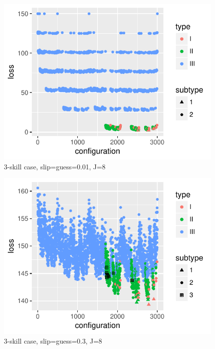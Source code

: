 \documentclass{edm_template}
\begin{document}
\begin{figure}[h!]
  \begin{center}
  \includegraphics[width=\columnwidth]{simResults/LossBestConfig_theta001_J8.pdf}
  \end{center}
  \caption{3-skill case, slip=guess=0.01, J=8}  
  \label{fig:theta001J8ThreeSkill}
\end{figure}

\begin{figure}[h!]
  \begin{center}
  \includegraphics[width=\columnwidth]{simResults/LossBestConfig_theta03_J8.pdf}
  \end{center}
  \caption{3-skill case, slip=guess=0.3, J=8}  
  \label{fig:theta03J8ThreeSkill}
\end{figure}
\end{document}
